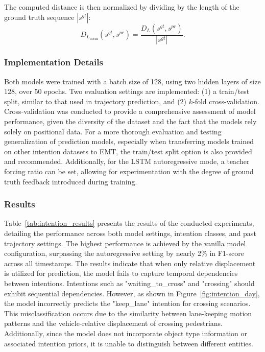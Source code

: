 \begin{itemize}
    The computed distance is then normalized by dividing by the length of the ground truth sequence \( |s^{gt}| \):
    \begin{equation*}
        D_{L_{\text{norm}}}(s^{gt}, s^{pr}) = \frac{D_L(s^{gt}, s^{pr})}{|s^{gt}|}.
    \end{equation*}
\end{itemize}


\subsubsection{Implementation Details}
Both models were trained with a batch size of 128, using two hidden layers of size 128, over 50 epochs. Two evaluation settings are implemented: (1) a train/test split, similar to that used in trajectory prediction, and (2) \(k\)-fold cross-validation. Cross-validation was conducted to provide a comprehensive assessment of model performance, given the diversity of the dataset and the fact that the models rely solely on positional data. For a more thorough evaluation and testing generalization of prediction models, especially when transferring models trained on other intention datasets to EMT, the train/test split option is also provided and recommended. Additionally, for the LSTM autoregressive mode, a teacher forcing ratio can be set, allowing for experimentation with the degree of ground truth feedback introduced during training.


\subsubsection{Results}
Table~\ref{tab:intention_results} presents the results of the conducted experiments, detailing the performance across both model settings, intention classes, and past trajectory settings. The highest performance is achieved by the vanilla model configuration, surpassing the autoregressive setting by nearly 2\% in F1-score across all timestamps. The results indicate that when only relative displacement is utilized for prediction, the model fails to capture temporal dependencies between intentions. Intentions such as "waiting\_to\_cross" and "crossing" should exhibit sequential dependencies. However, as shown in Figure~\ref{fig:intention_day}, the model incorrectly predicts the "keep\_lane" intention for crossing scenarios. This misclassification occurs due to the similarity between lane-keeping motion patterns and the vehicle-relative displacement of crossing pedestrians. Additionally, since the model does not incorporate object type information or associated intention priors, it is unable to distinguish between different entities. 

